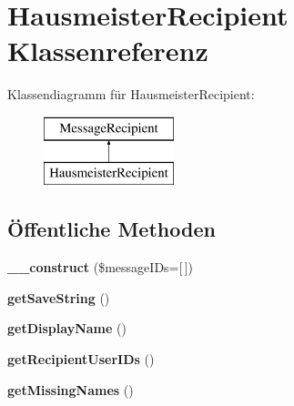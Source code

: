 \hypertarget{class_hausmeister_recipient}{}\section{Hausmeister\+Recipient Klassenreferenz}
\label{class_hausmeister_recipient}
Klassendiagramm für Hausmeister\+Recipient\+:\begin{figure}[H]
\begin{center}
\leavevmode
\includegraphics[height=2.000000cm]{class_hausmeister_recipient}
\end{center}
\end{figure}
\subsection*{Öffentliche Methoden}
\begin{DoxyCompactItemize}
\item 
\mbox{\label{class_hausmeister_recipient_a53c86e5d443315d835aebb37fe30930f}} 
{\bfseries \+\_\+\+\_\+construct} (\$message\+I\+Ds=\mbox{[}$\,$\mbox{]})
\item 
\mbox{\label{class_hausmeister_recipient_aa454e084b68a58e1a00efd1a095f63e0}} 
{\bfseries get\+Save\+String} ()
\item 
\mbox{\label{class_hausmeister_recipient_a5960db12e94a9ff78f3f3dcf3b105ea3}} 
{\bfseries get\+Display\+Name} ()
\item 
\mbox{\label{class_hausmeister_recipient_a44b0bf69264b6edc3655c72e9fccd7bf}} 
{\bfseries get\+Recipient\+User\+I\+Ds} ()
\item 
\mbox{\label{class_hausmeister_recipient_abb71ecc011257ab2c284ef8a01d8b035}} 
{\bfseries get\+Missing\+Names} ()
\end{DoxyCompactItemize}
